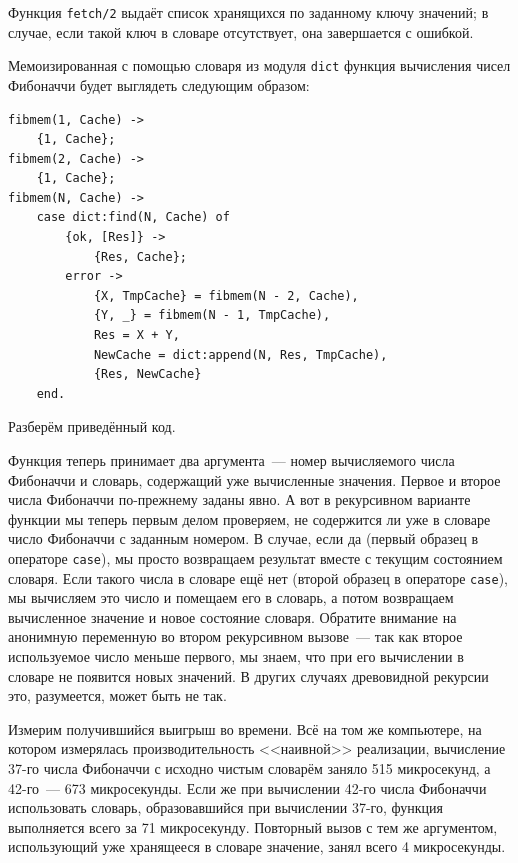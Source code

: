 \documentclass[
  paper=a4,
  fontsize=14pt,
  openany,
  appendixprefix=true
]{scrbook}
\begin{document}


Функция \lstinline{fetch/2} выдаёт список хранящихся по заданному ключу значений; в случае, если такой ключ в словаре отсутствует, она завершается с ошибкой.


Мемоизированная с помощью словаря из модуля \lstinline{dict} функция вычисления чисел Фибоначчи будет выглядеть следующим образом:

\begin{lstlisting}
fibmem(1, Cache) ->
    {1, Cache};
fibmem(2, Cache) ->
    {1, Cache};
fibmem(N, Cache) ->
    case dict:find(N, Cache) of
        {ok, [Res]} ->
            {Res, Cache};
        error ->
            {X, TmpCache} = fibmem(N - 2, Cache),
            {Y, _} = fibmem(N - 1, TmpCache),
            Res = X + Y,
            NewCache = dict:append(N, Res, TmpCache),
            {Res, NewCache}
    end.
\end{lstlisting}

Разберём приведённый код.

Функция теперь принимает два аргумента~--- номер вычисляемого числа Фибоначчи и словарь, содержащий уже вычисленные значения. Первое и второе числа Фибоначчи по-прежнему заданы явно. А вот в рекурсивном варианте функции мы теперь первым делом проверяем, не содержится ли уже в словаре число Фибоначчи с заданным номером. В случае, если да (первый образец в операторе \lstinline{case}), мы просто возвращаем результат вместе с текущим состоянием словаря. Если такого числа в словаре ещё нет (второй образец в операторе \lstinline{case}), мы вычисляем это число и помещаем его в словарь, а потом возвращаем вычисленное значение и новое состояние словаря. Обратите внимание на анонимную переменную во втором рекурсивном вызове~--- так как второе используемое число меньше первого, мы знаем, что при его вычислении в словаре не появится новых значений. В других случаях древовидной рекурсии это, разумеется, может быть не так.

Измерим получившийся выигрыш во времени. Всё на том же компьютере, на котором измерялась производительность <<наивной>> реализации, вычисление 37-го числа Фибоначчи с исходно чистым словарём заняло 515 микросекунд, а 42-го~--- 673 микросекунды. Если же при вычислении 42-го числа Фибоначчи использовать словарь, образовавшийся при вычислении 37-го, функция выполняется всего за 71 микросекунду. Повторный вызов с тем же аргументом, использующий уже хранящееся в словаре значение, занял всего 4 микросекунды.
\end{document}
